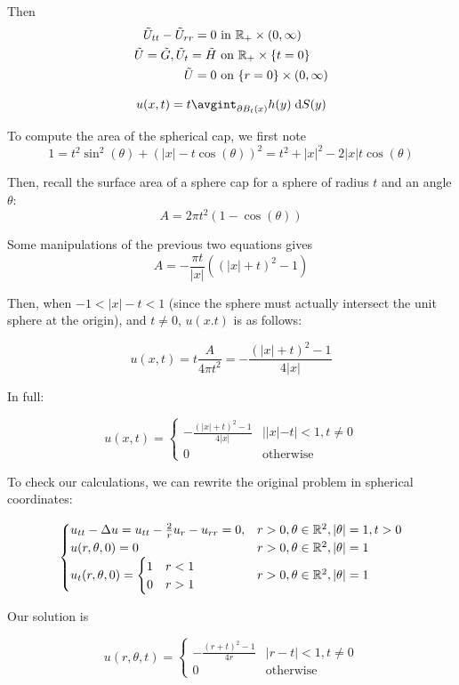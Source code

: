 Then
\begin{align*}
  \tilde{U}_{tt} - \tilde{U}_{rr} = 0 & \text{ in } \mathbb{R}_+ \times (0, \infty)\\
  \tilde{U} = \tilde{G}, \tilde{U}_t = \tilde{H} & \text{ on } \mathbb{R}_+ \times \{ t = 0 \}\\
  \tilde{U} = 0 & \text{ on } \{ r = 0 \} \times (0, \infty)
\end{align*}

$$
u(x, t) = t \avgint_{\bndry{\ball{x}{t}}} h(y) \dd{S(y)}
$$

To compute the area of the spherical cap, we first note
$$
1 = t^2 \sin^2(\theta) + (|x| - t \cos(\theta))^2 = t^2 + |x|^2 - 2 |x| t \cos(\theta)
$$

Then, recall the surface area of a sphere cap for a sphere of radius $t$ and an angle $\theta$:
$$
A = 2 \pi t^2 (1 - \cos(\theta))
$$

Some manipulations of the previous two equations gives
$$
A = -\frac{\pi t}{|x|} \left( (|x| + t)^2 - 1 \right)
$$

Then, when $-1 < |x| - t < 1$ (since the sphere must actually intersect the unit sphere at the origin),
and $t \neq 0$, $u(x. t)$ is as follows:

$$
u(x, t) = t \frac{A}{4 \pi t^2} = -\frac{(|x| + t)^2 - 1}{4 |x|}
$$

In full:

$$
u(x, t) =
\begin{cases}
  -\frac{(|x| + t)^2 - 1}{4 |x|} & ||x| - t| < 1, t \neq 0\\
  0 & \text{otherwise}
\end{cases}
$$

To check our calculations, we can rewrite the original problem in spherical coordinates:

$$
\begin{cases}
  u_{tt} - \Delta u = u_{tt} - \frac{2}{r} u_r - u_{rr} = 0, & r > 0, \theta \in \mathbb{R}^2, |\theta| = 1, t > 0\\
  u(r, \theta, 0) = 0 & r > 0, \theta \in \mathbb{R}^2, |\theta| = 1\\
  u_t(r, \theta, 0) =
  \begin{cases}
    1 & r < 1\\
    0 & r > 1
  \end{cases} & r > 0, \theta \in \mathbb{R}^2, |\theta| = 1
\end{cases}
$$

Our solution is

$$
u(r, \theta, t) =
\begin{cases}
  -\frac{(r + t)^2 - 1}{4 r} & |r - t| < 1, t \neq 0\\
  0 & \text{otherwise}
\end{cases}
$$


